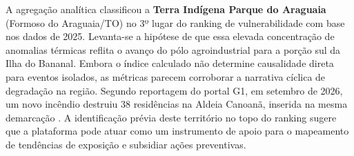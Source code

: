 A agregação analítica classificou a \textbf{Terra Indígena Parque do Araguaia} (Formoso do Araguaia/TO) no 3º lugar do ranking de vulnerabilidade com base nos dados de 2025. Levanta-se a hipótese de que essa elevada concentração de anomalias térmicas reflita o avanço do pólo agroindustrial para a porção sul da Ilha do Bananal. Embora o índice calculado não determine causalidade direta para eventos isolados, as métricas parecem corroborar a narrativa cíclica de degradação na região. Segundo reportagem do portal G1, em setembro de 2026, um novo incêndio destruiu 38 residências na Aldeia Canoanã, inserida na mesma demarcação \cite{g1_canoana_2026}. A identificação prévia deste território no topo do ranking sugere que a plataforma pode atuar como um instrumento de apoio para o mapeamento de tendências de exposição e subsidiar ações preventivas.
